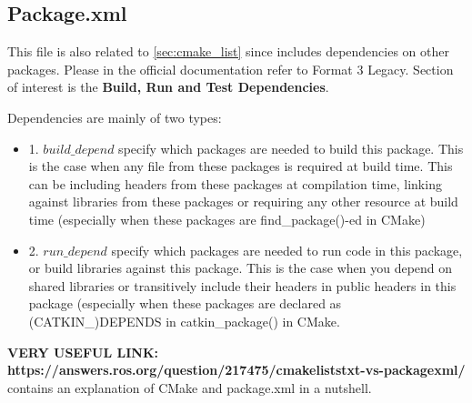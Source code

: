 \documentclass[11pt,a4paper]{article}
\begin{document}
\subsection{Package.xml}

This file is also related to \ref{sec:cmake_list} since includes dependencies on other packages. Please in the official documentation refer to Format 3 Legacy. Section of interest is the \textbf{Build, Run and Test Dependencies}. 

\vline

Dependencies are mainly of two types:
\begin{itemize}
\item 1. $build{\_}depend$ specify which packages are needed to build this package. This is the case when any file from these packages is required at build time. This can be including headers from these packages at compilation time, linking against libraries from these packages or requiring any other resource at build time (especially when these packages are find{\_}package()-ed in CMake)
\item 2. $run{\_}depend$ specify which packages are needed to run code in this package, or build libraries against this package. This is the case when you depend on shared libraries or transitively include their headers in public headers in this package (especially when these packages are declared as (CATKIN{\_})DEPENDS in catkin{\_}package() in CMake.
\end{itemize}

\vline

   \textbf{VERY USEFUL LINK: https://answers.ros.org/question/217475/cmakeliststxt-vs-packagexml/} contains an explanation of CMake and package.xml in a nutshell.


\end{document}
